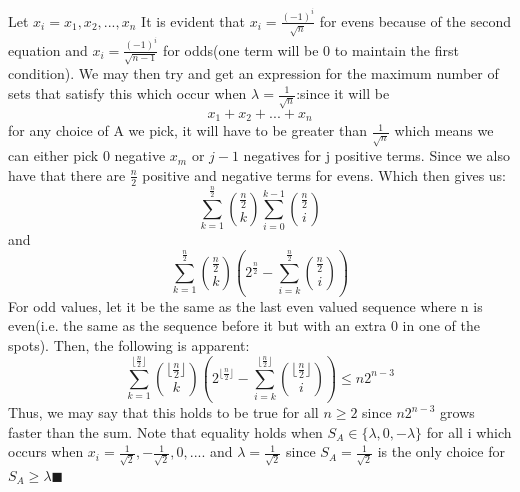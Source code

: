 \begin{enumerate}
Let $x_i=x_1,x_2,...,x_n$ It is evident that $x_i = \frac{(-1)^i}{\sqrt{n}}$ for evens because of the second equation and $x_i=\frac{(-1)^i}{\sqrt{n-1}}$ for odds(one term will be 0 to maintain the first condition). We may then try and get an expression for the maximum number of sets that satisfy this which occur when $\lambda = \frac{1}{\sqrt{n}}$:since it will be 
 \[x_1 + x_2 + ... + x_n\]for any choice of A we pick, it will have to be greater than $\frac{1}{\sqrt{n}}$ which means we can either pick 0 negative $x_m$ or $j-1$ negatives for j positive terms. Since we also have that there are $\frac{n}{2}$ positive and negative terms for evens. Which then gives us:
 \[\sum_{k=1}^{\frac{n}{2}} \binom{\frac{n}{2}}{k}\sum_{i=0}^{k-1} \binom{\frac{n}{2}}{i}\]and 
 \[\sum_{k=1}^{\frac{n}{2}}\binom{\frac{n}{2}}{k}\left(2^{\frac{n}{2}} - \sum_{i=k}^{\frac{n}{2}} \binom{\frac{n}{2}}{i}\right)\]For odd values, let it be the same as the last even valued sequence where n is even(i.e. the same as the sequence before it but with an extra 0 in one of the spots). Then, the following is apparent: 
 \[\sum_{k=1}^{\lfloor\frac{n}{2}\rfloor}\binom{\lfloor \frac{n}{2}\rfloor}{k}\left(2^{\lfloor\frac{n}{2}\rfloor} - \sum_{i=k}^{\lfloor\frac{n}{2}\rfloor}\binom{\lfloor \frac{n}{2}\rfloor}{i}\right)  \le n2^{n-3}\]Thus, we may say that this holds to be true for all $n \ge 2$ since $n2^{n-3}$ grows faster than the sum. Note that equality holds when $S_A \in \{\lambda,0,-\lambda\}$ for all i which occurs when $x_i= \frac{1}{\sqrt{2}},-\frac{1}{\sqrt{2}},0,....$ and $\lambda = \frac{1}{\sqrt{2}}$ since $S_A=\frac{1}{\sqrt{2}}$ is the only choice for $S_A \ge \lambda$$\blacksquare$


\end{enumerate}
